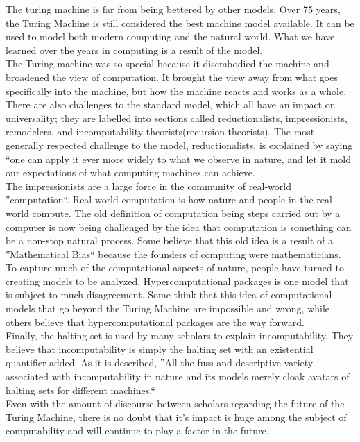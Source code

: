 \documentclass[11pt]{article}
\begin{document}
\begin{spacing}{1.5}
 \indent The turing machine is far from being bettered by other models. Over 75 years, the Turing Machine is still considered the best machine
 model available. It can be used to model both modern computing and the natural world. What we have learned over the years in computing is a
 result of the model. \\
 \indent The Turing machine was so special because it disembodied the machine and broadened the view of computation. It brought the view away
 from what goes specifically into the machine, but how the machine reacts and works as a whole. There are also challenges to the standard model,
 which all have an impact on universality; they are labelled into sections called reductionalists, impressionists, remodelers, and incomputability
 theorists(recursion theorists). The most generally respected challenge to the model, reductionalists, is explained by saying ``one can apply 
 it ever more widely to what we observe in nature, and let it mold our expectations of what computing machines can achieve. \\
 \indent The impressionists are a large force in the community of real-world ''computation``. Real-world computation is how nature and people in
 the real world compute. The old definition of computation being steps carried out by a computer is now being challenged by the idea that computation
 is something can be a non-stop natural process. Some believe that this old idea is a result of a ''Mathematical Bias`` because the founders of
 computing were mathematicians. \\
 \indent To capture much of the computational aspects of nature, people have turned to creating models to be analyzed. Hypercomputational 
 packages is one model that is subject to much disagreement. Some think that this idea of computational models that go beyond the Turing Machine
 are impossible and wrong, while others believe that hypercomputational packages are the way forward. \\
 \indent Finally, the halting set is used by many scholars to explain incomputability. They believe that incomputability is simply the halting set
 with an existential quantifier added. As it is described, ''All the fuss and descriptive variety associated with incomputability in nature and 
 its models merely cloak avatars of halting sets for different machines.``  \\
 \indent Even with the amount of discourse between scholars regarding the future of the Turing Machine, there is no doubt that it's impact is huge among
 the subject of computability and will continue to play a factor in the future.
\end{spacing}
\end{document}
